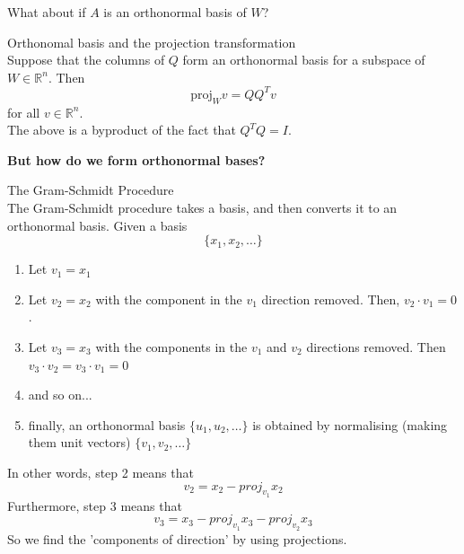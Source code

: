 \documentclass[journal, letterpaper]{IEEEtran}
\begin{document}
    What about if $A$ is an orthonormal basis of $W$?
    \begin{myboxr}{Orthonomal basis and the projection transformation} \\ 
        Suppose that the columns of $Q$ form an orthonormal basis for a subspace of $W \in \mathbb{R}^n$. Then
        $$ \text{proj}_Wv = QQ^Tv$$
        for all $v \in \mathbb{R}^n$.
        \newline \\ 
        The above is a byproduct of the fact that $Q^TQ = I$.
    \end{myboxr}
    \textbf{But how do we form orthonormal bases?}
    \begin{mybox}{The Gram-Schmidt Procedure} \\ 
        The Gram-Schmidt procedure takes a basis, and then converts it to an orthonormal basis. Given a basis 
        $$ \{x_1, x_2, \dots\}$$
        \begin{enumerate}
            \item Let $v_1 = x_1$
            \item Let $v_2 = x_2$ with the component in the $v_1$ direction removed. Then, $v_2 \cdot v_1 = 0$.
            \item Let $v_3 = x_3$ with the components in the $v_1$ and $v_2$ directions removed. Then $v_3 \cdot v_2 = v_3 \cdot v_1 = 0$
            \item and so on...
            \item finally, an orthonormal basis $\{u_1, u_2, \dots \}$ is obtained by normalising (making them unit vectors) $\{v_1, v_2, \dots\}$
        \end{enumerate}
        In other words, step 2 means that
        $$ v_2 = x_2 - proj_{v_1}x_2$$
        Furthermore, step 3 means that
        $$ v_3 = x_3 - proj_{v_1}x_3 - proj_{v_2}x_3$$
        So we find the 'components of direction' by using projections.
    \end{mybox}
\end{document}
